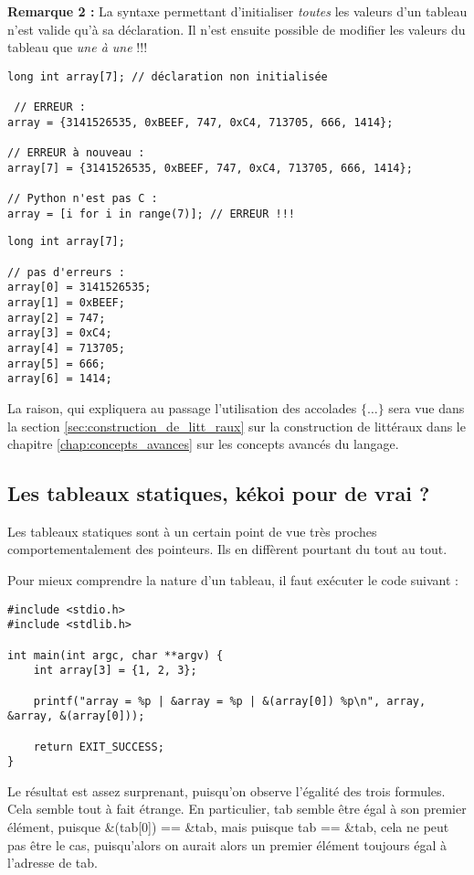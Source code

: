 \documentclass[../../../main.tex]{subfiles}
\begin{document}
\textbf{Remarque 2 :} La syntaxe permettant d'initialiser \textit{toutes} les valeurs d'un tableau n'est valide qu'à sa déclaration. Il n'est ensuite possible de modifier les valeurs du tableau que \textit{une à une} !!!  

\begin{minipage}{0.75\textwidth}
\begin{verbatim}
long int array[7]; // déclaration non initialisée

 // ERREUR :
array = {3141526535, 0xBEEF, 747, 0xC4, 713705, 666, 1414};

// ERREUR à nouveau :
array[7] = {3141526535, 0xBEEF, 747, 0xC4, 713705, 666, 1414}; 

// Python n'est pas C :
array = [i for i in range(7)]; // ERREUR !!!
\end{verbatim}
\end{minipage}
\begin{minipage}{0.25\textwidth}
\begin{verbatim}
long int array[7];

// pas d'erreurs :
array[0] = 3141526535;
array[1] = 0xBEEF;
array[2] = 747;
array[3] = 0xC4;
array[4] = 713705;
array[5] = 666;
array[6] = 1414;
\end{verbatim}
\end{minipage}
La raison, qui \og expliquera \fg au passage l'utilisation des accolades $\{\dots\}$ sera vue dans la section \ref{sec:construction_de_litt_raux} sur la construction de littéraux dans le chapitre \ref{chap:concepts_avances} sur les concepts avancés du langage.
\subsection{Les tableaux statiques, kékoi pour de vrai ?}
\label{sub:les_tableaux_statiques_k_koi_pour_de_vrai_}
Les tableaux statiques sont à un certain point de vue très proches comportementalement des pointeurs. Ils en diffèrent pourtant du tout au tout.
 
Pour mieux comprendre la nature d'un tableau, il faut exécuter le code suivant :
\begin{verbatim}
#include <stdio.h>
#include <stdlib.h>

int main(int argc, char **argv) {
	int array[3] = {1, 2, 3};

	printf("array = %p | &array = %p | &(array[0]) %p\n", array, &array, &(array[0]));

	return EXIT_SUCCESS;
}
\end{verbatim}
Le résultat est assez surprenant, puisqu'on observe l'égalité des trois formules. Cela semble tout à fait étrange. En particulier, \textsf{tab} semble être égal à son premier élément, puisque \textsf{\&(tab[0]) == \&tab}, mais puisque \textsf{tab == \&tab}, cela ne peut pas être le cas, puisqu'alors on aurait alors un premier élément toujours égal à l'adresse de \textsf{tab}.
 
\end{document}
